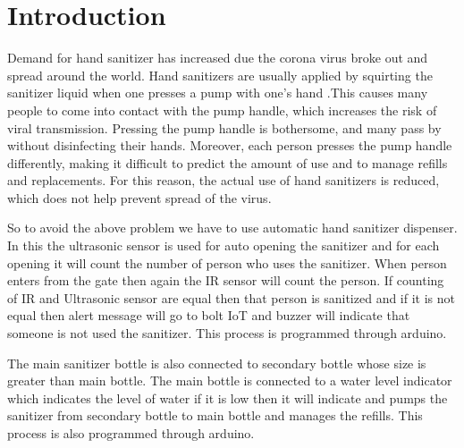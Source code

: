 
  
  
  	\chapter {Introduction}
 
	\hspace{0.5cm} Demand for hand sanitizer has increased due the corona virus broke out and spread around the world. Hand sanitizers are usually applied by squirting the sanitizer liquid when one presses a pump with one’s hand .This causes many people to come into contact with the pump handle, which increases the risk of viral transmission. Pressing the pump handle is bothersome, and many pass by without disinfecting their hands. Moreover, each person presses the pump handle differently, making it difficult to predict the amount of use and to manage refills and replacements. For this reason, the actual use of hand sanitizers is reduced, which does not help prevent spread of the virus.
   
   So to avoid the above problem we have to use automatic hand sanitizer dispenser. In this the ultrasonic sensor is used for auto opening the sanitizer and for each opening it will count the number of person who uses the sanitizer. When person enters from the gate then again the IR sensor will count the person. If counting of IR and Ultrasonic sensor are equal then that person is sanitized and if it is not equal then alert message will go to bolt IoT and buzzer will indicate that someone is not used the sanitizer. This process is programmed through arduino. 
    
   The main sanitizer bottle is also connected to secondary bottle whose size is greater than main bottle. The main bottle is connected to a water level indicator which indicates the level of water if it is low then it will indicate and pumps the sanitizer from secondary bottle to main bottle and manages the refills. This process is also programmed through arduino.

\vspace{0.6cm}


  

 


